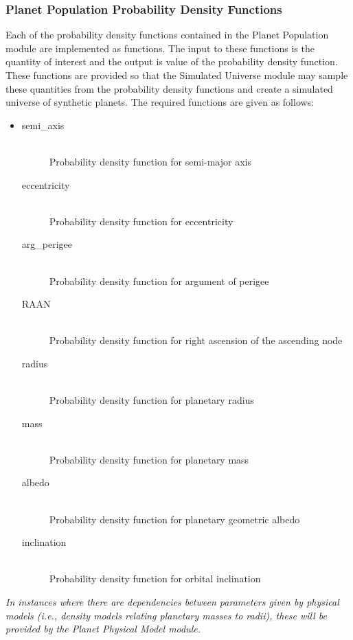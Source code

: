 \documentclass[cleanfoot]{asme2ej}
\begin{document}
\subsubsection{Planet Population Probability Density Functions} \label{sec:pdfs}
Each of the probability density functions contained in the Planet Population module are implemented as functions.  The input to these functions is the quantity of interest and the output is value of the probability density function.  These functions are provided so that the Simulated Universe module may sample these quantities from the probability density functions and create a simulated universe of synthetic planets.  The required functions are given as follows:

\begin{itemize}
    \item 
    \begin{description}
        \item[semi\_axis] \hfill \\
        Probability density function for semi-major axis
        \item[eccentricity] \hfill \\
        Probability density function for eccentricity
        \item[arg\_perigee] \hfill \\
        Probability density function for argument of perigee
        \item[RAAN] \hfill \\
        Probability density function for right ascension of the ascending node
        \item[radius] \hfill \\
        Probability density function for planetary radius
        \item[mass] \hfill \\
        Probability density function for planetary mass
        \item[albedo] \hfill \\
        Probability density function for planetary geometric albedo
        \item[inclination] \hfill \\
        Probability density function for orbital inclination
    \end{description}
\end{itemize}

\emph{In instances where there are dependencies between parameters given by physical models (i.e., density models relating planetary masses to radii), these will be provided by the Planet Physical Model module.}
\end{document}
